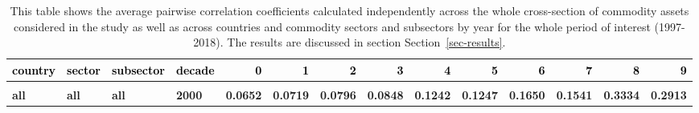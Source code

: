 \documentclass[
  authoryear,
  preprint,
  3p]{elsarticle}
\begin{document}
\begin{landscape}\begingroup\fontsize{7}{9}\selectfont

\begin{longtable}[t]{>{}l>{}l>{}l>{}l>{}r>{}r>{}r>{}r>{}r>{}r>{}r>{}r>{}r>{}r}

\caption{\label{tbl-correlations-years}This table shows the average
pairwise correlation coefficients calculated independently across the
whole cross-section of commodity assets considered in the study as well
as across countries and commodity sectors and subsectors by year for the
whole period of interest (1997-2018). The results are discussed in
section Section~\ref{sec-results}.}

\tabularnewline

\toprule
\textcolor{black}{\textbf{country}} & \textcolor{black}{\textbf{sector}} & \textcolor{black}{\textbf{subsector}} & \textcolor{black}{\textbf{decade}} & \textcolor{black}{\textbf{0}} & \textcolor{black}{\textbf{1}} & \textcolor{black}{\textbf{2}} & \textcolor{black}{\textbf{3}} & \textcolor{black}{\textbf{4}} & \textcolor{black}{\textbf{5}} & \textcolor{black}{\textbf{6}} & \textcolor{black}{\textbf{7}} & \textcolor{black}{\textbf{8}} & \textcolor{black}{\textbf{9}}\\
\midrule
\textbf{\cellcolor{gray!10}{all}} & \textbf{\cellcolor{gray!10}{all}} & \textbf{\cellcolor{gray!10}{all}} & \textbf{\cellcolor{gray!10}{1990}} & \textcolor[HTML]{4285f4}{\textbf{\cellcolor{gray!10}{}}} & \textcolor[HTML]{4285f4}{\textbf{\cellcolor{gray!10}{}}} & \textcolor[HTML]{4285f4}{\textbf{\cellcolor{gray!10}{}}} & \textcolor[HTML]{4285f4}{\textbf{\cellcolor{gray!10}{}}} & \textcolor[HTML]{4285f4}{\textbf{\cellcolor{gray!10}{}}} & \textcolor[HTML]{4285f4}{\textbf{\cellcolor{gray!10}{}}} & \textcolor[HTML]{4285f4}{\textbf{\cellcolor{gray!10}{}}} & \textcolor[HTML]{4285f4}{\textbf{\cellcolor{gray!10}{0.0401}}} & \textcolor[HTML]{4285f4}{\textbf{\cellcolor{gray!10}{0.0812}}} & \textcolor[HTML]{4285f4}{\textbf{\cellcolor{gray!10}{0.0822}}}\\
\textbf{all} & \textbf{all} & \textbf{all} & \textbf{2000} & \textcolor[HTML]{4285f4}{\textbf{0.0652}} & \textcolor[HTML]{4285f4}{\textbf{0.0719}} & \textcolor[HTML]{4285f4}{\textbf{0.0796}} & \textcolor[HTML]{4285f4}{\textbf{0.0848}} & \textcolor[HTML]{4285f4}{\textbf{0.1242}} & \textcolor[HTML]{4285f4}{\textbf{0.1247}} & \textcolor[HTML]{4285f4}{\textbf{0.1650}} & \textcolor[HTML]{4285f4}{\textbf{0.1541}} & \textcolor[HTML]{4285f4}{\textbf{0.3334}} & \textcolor[HTML]{4285f4}{\textbf{0.2913}}\\

\end{longtable}
\end{landscape}
\end{document}
